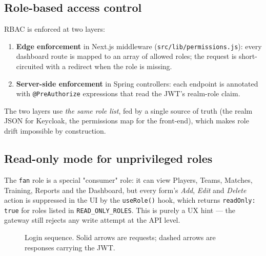 \documentclass[12pt,a4paper,oneside]{report}
\begin{document}
\subsection{Role-based access control}
RBAC is enforced at two layers:
\begin{enumerate}[leftmargin=*]
  \item \textbf{Edge enforcement} in Next.js middleware
        (\texttt{src/lib/permissions.js}): every dashboard route is mapped
        to an array of allowed roles; the request is short-circuited with
        a redirect when the role is missing.
  \item \textbf{Server-side enforcement} in Spring controllers: each endpoint
        is annotated with \texttt{@PreAuthorize} expressions that read the
        JWT's realm-role claim.
\end{enumerate}
The two layers use \emph{the same role list}, fed by a single source of
truth (the realm JSON for Keycloak, the permissions map for the front-end),
which makes role drift impossible by construction.

\subsection{Read-only mode for unprivileged roles}
The \texttt{fan} role is a special "consumer" role: it can view Players,
Teams, Matches, Training, Reports and the Dashboard, but every form's
\emph{Add}, \emph{Edit} and \emph{Delete} action is suppressed in the UI by
the \texttt{useRole()} hook, which returns \texttt{readOnly: true} for
roles listed in \texttt{READ\_ONLY\_ROLES}. This is purely a UX hint --- the
gateway still rejects any write attempt at the API level.

\begin{figure}[ht]
\centering
{}
\caption{Login sequence. Solid arrows are requests; dashed arrows are
         responses carrying the JWT.}
\label{fig:auth-seq}
\end{figure}
\end{document}
